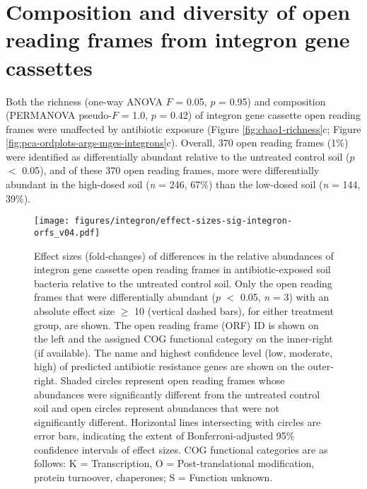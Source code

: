 \section{Composition and diversity of open reading frames from integron gene cassettes}

Both the richness (one-way ANOVA $F$ = 0.05, $p$ = 0.95) and composition (PERMANOVA pseudo-$F$ = 1.0, $p$ = 0.42) of integron gene cassette open reading frames were unaffected by antibiotic exposure (Figure \ref{fig:chao1-richness}c; Figure \ref{fig:pca-ordplots-args-mges-integrons}c).
Overall, 370 open reading frames (1\%) were identified as differentially abundant relative to the untreated control soil ($p$ $<$ 0.05), and of these 370 open reading frames, more were differentially abundant in the high-dosed soil (\textit{n} = 246, 67\%) than the low-dosed soil (\textit{n} = 144, 39\%).

\begin{figure}[htpb]
	\centering
		\texttt{[image: figures/integron/effect-sizes-sig-integron-orfs\_v04.pdf]}
	\caption[Effect sizes (fold-changes) of differences in the relative abundances of integron gene cassette open reading frames in antibiotic-exposed soil bacteria relative to the untreated control soil.]{
		Effect sizes (fold-changes) of differences in the relative abundances of integron gene cassette open reading frames in antibiotic-exposed soil bacteria relative to the untreated control soil.
		Only the open reading frames that were differentially abundant ($p$ $<$ 0.05, \textit{n} = 3) with an absolute effect size $\ge$ 10 (vertical dashed bars), for either treatment group, are shown.
		The open reading frame (ORF) ID is shown on the left and the assigned COG functional category on the inner-right (if available).
		The name and highest confidence level (low, moderate, high) of predicted antibiotic resistance genes are shown on the outer-right.
		Shaded circles represent open reading frames whose abundances were significantly different from the untreated control soil and open circles represent abundances that were not significantly different.
		Horizontal lines intersecting with circles are error bars, indicating the extent of Bonferroni-adjusted 95\% confidence intervals of effect sizes.
		COG functional categories are as follows:
		K = Transcription,
		O = Post-translational modification, protein turnoover, chaperones;
		S = Function unknown.
	}
	\label{fig:effect-sizes-sig-integron-orfs}
\end{figure}

